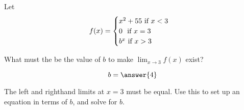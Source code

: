 \documentclass{ximera}
\author{Steven Gubkin}
\begin{document}
\begin{exercise}

Let \[f(x) = \begin{cases} x^2+55 \text{ if $x<3$}\\ $0 \text{ if $x=3$}$ \\ b^x \text{ if $x>3$}\end{cases}\]  
	
	What must the be the value of $b$ to make $\lim_{x \to 3} f(x)$ exist?
	
	\[b = \answer{4}\]
	
	\begin{hint}
		The left and righthand limits at $x=3$ must be equal.  Use this to set up an equation in terms of $b$, and solve for $b$.
	\end{hint}

\end{exercise}
\end{document}
